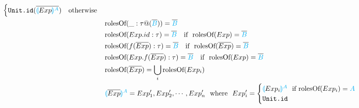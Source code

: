 \documentclass[11pt]{jarticle}
\newcommand{\projection}[2]{{\color{cyan}\llparenthesis}#1{\color{cyan}\rrparenthesis^#2}}
\begin{document}
\begin{alignat*}{2}
\begin{cases}
    \texttt{Unit.id}(\overline{\projection{Exp}{A}}) &\text{otherwise}
  \end{cases}\\
  &&&\text{rolesOf}(\_:\tau@(\overline{\color{cyan}B})) = {\overline{\color{cyan}B}}\\
  &&&\text{rolesOf}(Exp.id:\tau) = \overline{\color{cyan}B} ~~~\text{if}~~ \text{rolesOf}(Exp)=\overline{\color{cyan}B}\\
  &&&\text{rolesOf}(f(\overline{Exp}):\tau) = \overline{\color{cyan}B}~~~\text{if}~~\text{rolesOf}(\overline{Exp})=\overline{\color{cyan}B}\\
  &&&\text{rolesOf}(Exp.f(\overline{Exp}):\tau) = \overline{\color{cyan}B}~~~\text{if}~~\text{rolesOf}(Exp)=\overline{\color{cyan}B}\\
  &&&\text{rolesOf}(\overline{Exp}) = \bigcup_i \text{rolesOf}(Exp_i) \\
  &&&\projection{\overline{Exp}}{A} = Exp'_1,Exp'_2,\cdots,Exp'_n ~~\text{where}~~ Exp'_i =
  \begin{cases}
    \projection{Exp_i}{A}  ~~\text{if}~ \text{rolesOf}(Exp_i) = \color{cyan}{A}\\
    \texttt{Unit.id}
  \end{cases}\\
\end{alignat*}
\end{document}
